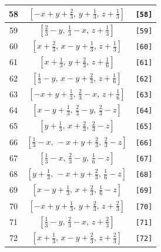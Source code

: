 \documentclass[fleqn,8pt]{jsarticle}
\begin{document}
\begin{longtable}{ccc}
58 & $\left[ - x + y + \frac{2}{3},\, y + \frac{1}{3},\, z + \frac{1}{3} \right]$ & {\tt [58]} \\ \hline
59 & $\left[ \frac{2}{3} - y,\, \frac{1}{3} - x,\, z + \frac{1}{3} \right]$ & {\tt [59]} \\ \hline
60 & $\left[ x + \frac{2}{3},\, x - y + \frac{1}{3},\, z + \frac{1}{3} \right]$ & {\tt [60]} \\ \hline
61 & $\left[ x + \frac{1}{3},\, y + \frac{2}{3},\, z + \frac{1}{6} \right]$ & {\tt [61]} \\ \hline
62 & $\left[ \frac{1}{3} - y,\, x - y + \frac{2}{3},\, z + \frac{1}{6} \right]$ & {\tt [62]} \\ \hline
63 & $\left[ - x + y + \frac{1}{3},\, \frac{2}{3} - x,\, z + \frac{1}{6} \right]$ & {\tt [63]} \\ \hline
64 & $\left[ x - y + \frac{1}{3},\, \frac{2}{3} - y,\, \frac{2}{3} - z \right]$ & {\tt [64]} \\ \hline
65 & $\left[ y + \frac{1}{3},\, x + \frac{2}{3},\, \frac{2}{3} - z \right]$ & {\tt [65]} \\ \hline
66 & $\left[ \frac{1}{3} - x,\, - x + y + \frac{2}{3},\, \frac{2}{3} - z \right]$ & {\tt [66]} \\ \hline
67 & $\left[ \frac{1}{3} - x,\, \frac{2}{3} - y,\, \frac{1}{6} - z \right]$ & {\tt [67]} \\ \hline
68 & $\left[ y + \frac{1}{3},\, - x + y + \frac{2}{3},\, \frac{1}{6} - z \right]$ & {\tt [68]} \\ \hline
69 & $\left[ x - y + \frac{1}{3},\, x + \frac{2}{3},\, \frac{1}{6} - z \right]$ & {\tt [69]} \\ \hline
70 & $\left[ - x + y + \frac{1}{3},\, y + \frac{2}{3},\, z + \frac{2}{3} \right]$ & {\tt [70]} \\ \hline
71 & $\left[ \frac{1}{3} - y,\, \frac{2}{3} - x,\, z + \frac{2}{3} \right]$ & {\tt [71]} \\ \hline
72 & $\left[ x + \frac{1}{3},\, x - y + \frac{2}{3},\, z + \frac{2}{3} \right]$ & {\tt [72]} \\
\end{longtable}
\end{document}
